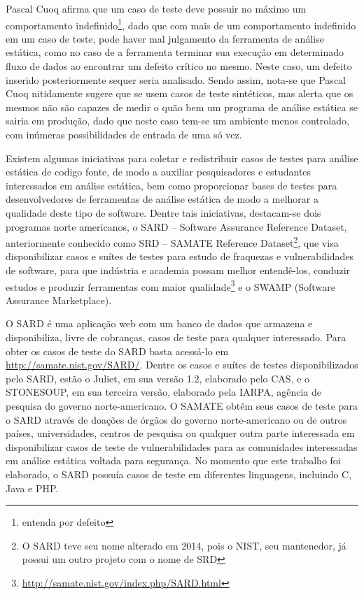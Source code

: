   Pascal Cuoq \cite{pascal} afirma que um caso de teste deve possuir no máximo um comportamento indefinido\footnote{entenda por defeito}, dado que com mais de um comportamento indefinido em um caso de teste, pode haver mal julgamento da ferramenta de análise estática, como no caso de a ferramenta terminar sua execução em determinado fluxo de dados ao encontrar um defeito crítico no mesmo. Neste caso, um defeito inserido posteriormente sequer seria analisado. Sendo assim, nota-se que Pascal Cuoq nitidamente sugere que se usem casos de teste sintéticos, mas alerta que os mesmos não são capazes de medir o quão bem um programa de análise estática se sairia em produção, dado que neste caso tem-se um ambiente menos controlado, com inúmeras possibilidades de entrada de uma só vez.

  Existem algumas iniciativas para coletar e redistribuir casos de testes para análise estática de codigo fonte, de modo a auxiliar pesquisadores e estudantes interessados em análise estática, bem como proporcionar bases de testes para desenvolvedores de ferramentas de análise estática de modo a melhorar a qualidade deste tipo de software. Dentre tais iniciativas, destacam-se dois programas norte americanos, o SARD  – Software Assurance Reference Dataset, anteriormente conhecido como SRD – SAMATE Reference Dataset\footnote{O SARD teve seu nome alterado em 2014, pois o NIST, seu mantenedor, já possui um outro projeto com o nome de SRD}, que visa disponibilizar casos e suítes de testes para estudo de fraquezas e vulnerabilidades de software, para que indústria e academia possam melhor entendê-los, conduzir estudos e produzir ferramentas com maior qualidade\footnote{\url{http://samate.nist.gov/index.php/SARD.html}} e o SWAMP (Software Assurance Marketplace).

  O SARD é uma aplicação web com um banco de dados que armazena e disponibiliza, livre de cobranças, casos de teste para qualquer interessado. Para obter os casos de teste do SARD basta acessá-lo em \url{http://samate.nist.gov/SARD/}. Dentre os casos e suítes de testes disponibilizados pelo SARD, estão o Juliet, em sua versão 1.2, elaborado pelo CAS, e o STONESOUP, em sua terceira versão, elaborado pela IARPA, agência de pesquisa do governo norte-americano. O SAMATE obtém seus casos de teste para o SARD através de doações de órgãos do governo norte-americano ou de outros países, universidades, centros de pesquisa ou qualquer outra parte interessada em disponibilizar casos de teste de vulnerabilidades para as comunidades interessadas em análise estática voltada para segurança. No momento que este trabalho foi elaborado, o SARD possuía casos de teste em diferentes linguagens, incluindo C, Java e PHP.

